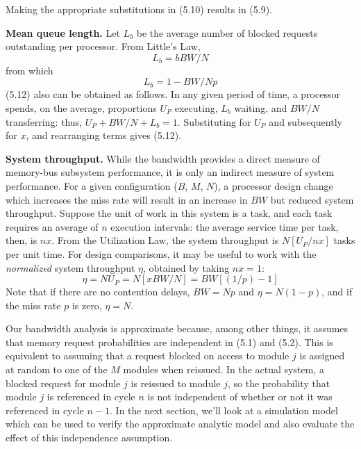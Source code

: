 \noindent Making the appropriate substitutions in (5.10) results in (5.9).

\noindent\textbf{Mean queue length.} Let $L_b$ be the average number of blocked requests
outstanding per processor. From Little's Law,
\begin{equation}
L_b=bBW/N
\end{equation}
from which
\begin{equation}
L_b=1-BW/Np
\end{equation}
(5.12) also can be obtained as follows. In any given period of time, a processor
spends, on the average, proportions $U_P$ executing, $L_b$ waiting, and $BW/N$
transferring: thus, $U_P+BW/N+L_b=1$. Substituting for $U_P$ and subsequently
for $x$, and rearranging terms gives (5.12).

\noindent\textbf{System throughput.} While the bandwidth provides a direct measure of
memory-bus subsystem performance, it is only an indirect measure of system
performance. For a given configuration ($B$, $M$, $N$), a processor design change
which increases the miss rate will result in an increase in $BW$ but reduced
system throughput. Suppose the unit of work in this system is a task, and
each task requires an average of $n$ execution intervals: the average service
time per task, then, is $nx$. From the Utilization Law, the system throughput
is $N[U_P/nx]$ tasks per unit time. For design comparisons, it may be useful to
work with the \emph{normalized} system throughput $\eta$, obtained by taking $nx=1$:
\begin{equation}
\eta=NU_P=N[xBW/N]=BW[(1/p)-1]
\end{equation}
Note that if there are no contention delays, $BW=Np$ and $\eta=N(1-p)$, and
if the miss rate $p$ is zero, $\eta=N$.

Our bandwidth analysis is approximate because, among other things, it
assumes that memory request probabilities are independent in (5.1) and (5.2).
This is equivalent to assuming that a request blocked on access to module $j$ is
assigned at random to one of the $M$ modules when reissued. In the actual
system, a blocked request for module $j$ is reissued to module $j$, so the probability
that module $j$ is referenced in cycle $n$ is not independent of whether or
not it was referenced in cycle $n-1$. In the next section, we'll look at a
simulation model which can be used to verify the approximate analytic
model and also evaluate the effect of this independence assumption.

